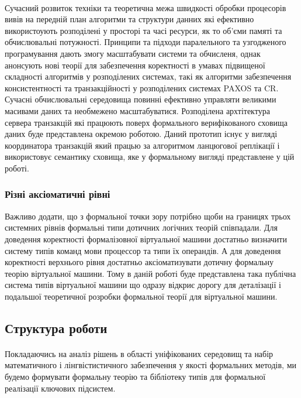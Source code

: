 \documentclass[11pt,oneside]{article}
\begin{document}
   \paragraph{}
   Сучасний розвиток техніки та теоретична межа швидкості обробки процесорів вивів на передній план алгоритми та структури
   данних які ефективно використоують розподілені у просторі та часі ресурси, як то об’єми памяті та обчислювальні потужності.
   Принципи та підходи паралельного та узгодженого програмування дають змогу масштабувати системи та обчисленя, однак
   анонсують нові теорії для забезпечення коректності в умавах підвищеної складності алгоритмів у розподілених системах,
   такі як алгоритми забезпечення консистентності та транзакційності у розподілених системах PAXOS та CR.
   Сучасні обчислювальні середовища повинні ефективно управляти великими масивами
   даних та необмежено масштабуватися. Розподілена архтітектура сервера транзакцій
   які працюють поверх формального верифікованого сховища даних буде представлена
   окремою роботою. Даний прототип існує у вигляді координатора транзакцій який працью
   за алгоритмом ланцюгової реплікації і використовує семантику сховища, яке
   у формальному вигляді представлене у цій роботі.

\subsubsection{Різні аксіоматичні рівні}

   Важливо додати, що з формальної точки зору потрібно щоби на границях
   трьох системних рівнів формальні типи дотичних логічних теорій співпадали.
   Для доведення коректності формалізовної віртуальної машини достатньо
   визначити систему типів команд мови процессор та типи їх операндів. А для
   доведення коректності верхнього рівня достатньо аксіоматизувати дотичну
   формальну теорію віртуальної машини. Тому в даній роботі буде представлена
   така публічна система типів віртуальної машини що одразу відкриє дорогу
   для деталізації і подальшої теоретичної розробки формальної теорії для віртуальної машини.

\newpage

\subsection{Структура роботи}
\vspace{0.5cm}

   \paragraph{}
   Покладаючись на аналіз рішень в області уніфікованих середовищ та
   набір математичного і лінгвістистичного забезпечення у якості формальних методів,
   ми будемо формувати формальну теорію та бібліотеку типів для формальної
   реалізації ключових підсистем.
\end{document}

